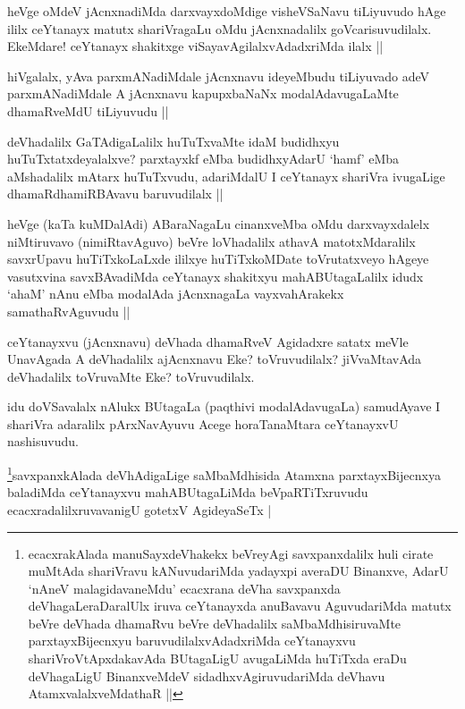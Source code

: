 \begin{artha}
heVge oMdeV jAcnxnadiMda darxvayxdoMdige visheVSaNavu tiLiyuvudo hAge ililx ceYtanayx matutx shariVragaLu oMdu jAcnxnadalilx goVcarisuvudilalx. EkeMdare! ceYtanayx shakitxge viSayavAgilalxvAdadxriMda ilalx ||
\end{artha}

\begin{artha}
hiVgalalx, yAva parxmANadiMdale jAcnxnavu ideyeMbudu tiLiyuvado adeV parxmANadiMdale A jAcnxnavu kapupxbaNaNx modalAdavugaLaMte dhamaRveMdU tiLiyuvudu ||
\end{artha}

\begin{artha}
deVhadalilx GaTAdigaLalilx huTuTxvaMte idaM budidhxyu huTuTxtatxdeyalalxve? parxtayxkf eMba budidhxyAdarU `hamf' eMba aMshadalilx mAtarx huTuTxvudu, adariMdalU I ceYtanayx shariVra ivugaLige dhamaRdhamiRBAvavu baruvudilalx ||
\end{artha}

\begin{artha}
heVge (kaTa kuMDalAdi) ABaraNagaLu cinanxveMba oMdu darxvayxdalelx niMtiruvavo (nimiRtavAguvo) beVre loVhadalilx athavA matotxMdaralilx savxrUpavu huTiTxkoLaLxde ililxye huTiTxkoMDate toVrutatxveyo hAgeye vasutxvina savxBAvadiMda ceYtanayx shakitxyu mahABUtagaLalilx idudx `ahaM' nAnu eMba modalAda jAcnxnagaLa vayxvahArakekx samathaRvAguvudu ||
\end{artha}

\begin{artha}
ceYtanayxvu (jAcnxnavu) deVhada dhamaRveV Agidadxre satatx meVle UnavAgada A deVhadalilx ajAcnxnavu Eke? toVruvudilalx? jiVvaMtavAda deVhadalilx toVruvaMte Eke? toVruvudilalx. 
\end{artha}

\begin{artha}
idu doVSavalalx nAlukx BUtagaLa (paqthivi modalAdavugaLa) samudAyave I shariVra adaralilx pArxNavAyuvu Acege horaTanaMtara ceYtanayxvU nashisuvudu.
\end{artha}

\begin{artha}
\footnote{ecacxrakAlada manuSayxdeVhakekx beVreyAgi savxpanxdalilx huli cirate muMtAda shariVravu kANuvudariMda yadayxpi averaDU Binanxve, AdarU `nAneV malagidavaneMdu' ecacxrana deVha savxpanxda deVhagaLeraDaralUlx iruva ceYtanayxda anuBavavu AguvudariMda matutx beVre deVhada dhamaRvu beVre deVhadalilx saMbaMdhisiruvaMte parxtayxBijecnxyu baruvudilalxvAdadxriMda ceYtanayxvu shariVroVtApxdakavAda BUtagaLigU avugaLiMda huTiTxda eraDu deVhagaLigU BinanxveMdeV sidadhxvAgiruvudariMda deVhavu AtamxvalalxveMdathaR ||}savxpanxkAlada deVhAdigaLige saMbaMdhisida Atamxna parxtayxBijecnxya baladiMda ceYtanayxvu mahABUtagaLiMda beVpaRTiTxruvudu ecacxradalilxruvavanigU gotetxV AgideyaSeTx |
\end{artha}

